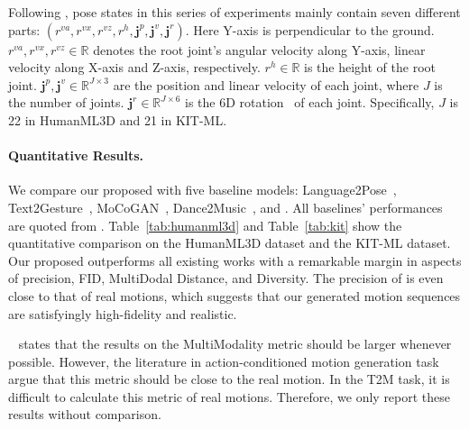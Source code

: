 Following \cite{guo2022generating}, pose states in this series of experiments mainly contain seven different parts: $(r^{va},r^{vx}, r^{vz},r^h, \mathbf{j}^p, \mathbf{j}^v, \mathbf{j}^r)$. Here Y-axis is perpendicular to the ground. $r^{va},r^{vx}, r^{vz} \in \mathbb{R}$ denotes the root joint's angular velocity along Y-axis, linear velocity along X-axis and Z-axis, respectively. $r^h \in \mathbb{R}$ is the height of the root joint. $\mathbf{j}^p, \mathbf{j}^v \in \mathbb{R}^{J \times 3}$ are the position and linear velocity of each joint, where $J$ is the number of joints. $\mathbf{j}^r \in \mathbb{R}^{J \times 6}$ is the 6D rotation~\citep{zhou2019continuity} of each joint. Specifically, $J$ is 22 in HumanML3D and 21 in KIT-ML.




\paragraph{Quantitative Results.}\label{sec4_1_4}

We compare our proposed \name with five baseline models:  Language2Pose~\citep{ahuja2019language2pose}, Text2Gesture~\citep{bhattacharya2021text2gestures}, MoCoGAN~\citep{tulyakov2018mocogan}, Dance2Music~\citep{lee2019dancing}, and \cite{guo2022generating}. All baselines' performances are quoted from \cite{guo2022generating}. Table~\ref{tab:humanml3d} and Table~\ref{tab:kit} show the quantitative comparison on the HumanML3D dataset and the KIT-ML dataset. Our proposed \name outperforms all existing works with a remarkable margin in aspects of precision, FID, MultiDodal Distance, and Diversity. The precision of \name is even close to that of real motions, which suggests that our generated motion sequences are satisfyingly high-fidelity and realistic. 

~\cite{guo2022generating} states that the results on the MultiModality metric should be larger whenever possible. However, the literature in action-conditioned motion generation task~\citep{guo2020action2motion,petrovich2021action,cervantes2022implicit} argue that this metric should be close to the real motion. In the T2M task, it is difficult to calculate this metric of real motions. Therefore, we only report these results without comparison.






